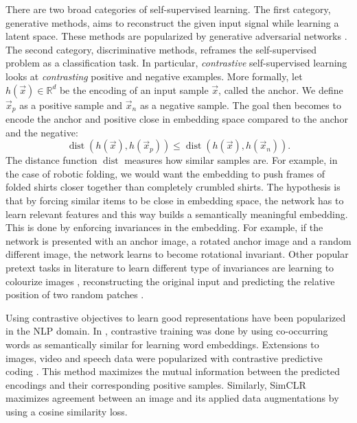 \documentclass[\home/main.tex]{subfiles}
\begin{document}
There are two broad categories of self-supervised learning. The first category, generative methods, aims to reconstruct the given input signal while learning a latent space. These methods are popularized by generative adversarial networks \autocite{goodfellow2014generative}. The second category, discriminative methods, reframes the self-supervised problem as a classification task. In particular, \emph{contrastive} self-supervised learning looks at \textit{contrasting} positive and negative examples. More formally, let \( h( \vec{x} ) \in \mathbb{R}^d \) be the encoding of an input sample \( \vec{x} \), called the anchor. We define \( \vec{x}_p \) as a positive sample and \( \vec{x}_n \) as a negative sample. The goal then becomes to encode the anchor and positive close in embedding space compared to the anchor and the negative:
\begin{equation*}
	\operatorname{dist}{\left( h(\vec{x}),h(\vec{x}_p) \right)} \leq \operatorname{dist}{\left( h(\vec{x}),h(\vec{x}_n) \right)} .
\end{equation*}
The distance function $\operatorname{dist}{}$ measures how similar samples are. For example, in the case of robotic folding, we would want the embedding to push frames of folded shirts closer together than completely crumbled shirts. The hypothesis is that by forcing similar items to be close in embedding space, the network has to learn relevant features and this way builds a semantically meaningful embedding. This is done by enforcing invariances in the embedding. For example, if the network is presented with an anchor image, a rotated anchor image and a random different image, the network learns to become rotational invariant. Other popular pretext tasks in literature to learn different type of invariances are learning to colourize images \autocite{Zhang2016Color}, reconstructing the original input \autocite{Pathak2016} and predicting the relative position of two random patches \autocite{Doersch2015}.


Using contrastive objectives to learn good representations have been popularized in the NLP domain. In \autocite{mikolov2013distributed}, contrastive training was done by using co-occurring words as semantically similar for learning word embeddings. Extensions to images, video and speech data were popularized with contrastive predictive coding \autocite{oord2018representation}. This method maximizes the mutual information between the predicted encodings and their corresponding positive samples. Similarly, SimCLR \autocite{chen2020simple} maximizes agreement between an image and its applied data augmentations by using a cosine similarity loss.
\end{document}
